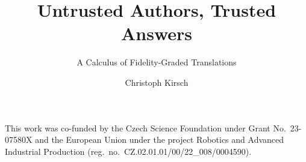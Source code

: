 \documentclass[sigplan,nonacm,10pt]{acmart}
\theoremstyle{definition}
\begin{document}
\title{Untrusted Authors, Trusted Answers}
\subtitle{A Calculus of Fidelity-Graded Translations}

\author{Christoph Kirsch}

\begin{abstract}

\end{abstract}

\maketitle









\begin{acks}
This work was co-funded by the Czech Science Foundation under Grant
No.~23-07580X and the European Union under the project Robotics and
Advanced Industrial Production
(reg.~no.~CZ.02.01.01/00/22\_008/0004590).
\end{acks}




\appendix

\end{document}
